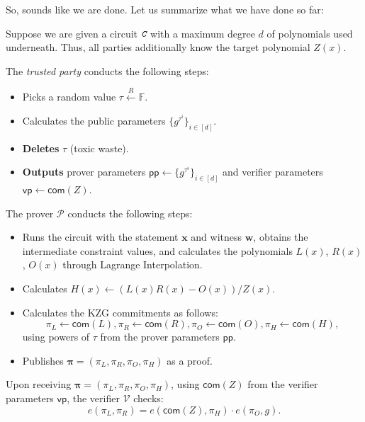 \documentclass[../lecture-notes-148x210.tex]{subfiles}
\begin{document}
So, sounds like we are done. Let us summarize what we have done so far:
\begin{tcolorbox}[title=Attempt \#1: Non-sound SNARK Protocol,
    breakable,
    colback=blue!5!white,
    colframe=blue!75!black,
    colbacktitle=blue!25!white,
    coltitle=blue!20!black,
    fonttitle=\bfseries,
    boxrule=1.25pt,
    subtitle style={boxrule=0pt,
    colback=blue!20!white,
    colupper=blue!75!gray} ]

    Suppose we are given a circuit $\textit{\texttt{C}}$ with a maximum degree $d$ of polynomials used underneath. Thus, all parties additionally know the target polynomial $Z(x)$.

    The \emph{trusted party} conducts the following steps:
    \begin{itemize}[label=]
        \item Picks a random value $\tau \xleftarrow{R} \mathbb{F}$.
        \item Calculates the public parameters $\{g^{\tau^i}\}_{i \in [d]}$.
        \item \textbf{Deletes} $\tau$ (toxic waste).
        \item \textbf{Outputs} prover parameters $\mathsf{pp} \gets \{g^{\tau^i}\}_{i \in [d]}$ and verifier parameters $\mathsf{vp} \gets \mathsf{com}(Z)$.
    \end{itemize}
    The prover $\mathcal{P}$ conducts the following steps:
    \begin{itemize}[label=]
        \item Runs the circuit with the statement $\mathbf{x}$ and witness $\mathbf{w}$, obtains the intermediate constraint values, and calculates the polynomials $L(x)$, $R(x)$, $O(x)$ through Lagrange Interpolation.
        \item Calculates $H(x) \gets (L(x)R(x) - O(x))\big/ Z(x)$.
        \item Calculates the KZG commitments as follows: 
        \begin{equation*}
            \pi_L \gets \mathsf{com}(L), \pi_R \gets \mathsf{com}(R), \pi_O \gets \mathsf{com}(O), \pi_H \gets \mathsf{com}(H),
        \end{equation*}
        using powers of $\tau$ from the prover parameters $\mathsf{pp}$.
        \item Publishes $\boldsymbol{\pi} = (\pi_L,\pi_R,\pi_O,\pi_H)$ as a proof.
    \end{itemize}
    Upon receiving $\boldsymbol{\pi} = (\pi_L,\pi_R,\pi_O,\pi_H)$, using $\mathsf{com}(Z)$ from the verifier parameters $\mathsf{vp}$, the verifier $\mathcal{V}$ checks:
    \begin{equation*}
        e(\pi_L, \pi_R) = e(\mathsf{com}(Z), \pi_H) \cdot e(\pi_O, g).
    \end{equation*}
\end{tcolorbox}
\end{document}
